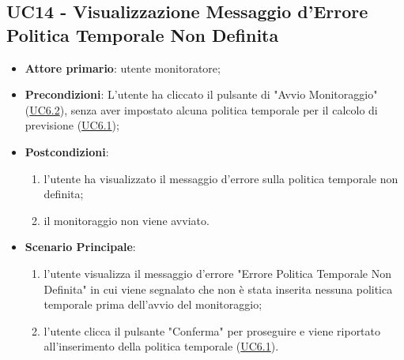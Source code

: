 
		\label{par:UC14}
	\subsection{UC14 - Visualizzazione Messaggio d'Errore Politica Temporale Non Definita}
		\begin{itemize}
			\item\textbf{Attore primario}: utente monitoratore;
			\item\textbf{Precondizioni}: L’utente ha cliccato il pulsante di "Avvio Monitoraggio" (\hyperref[par:UC6.2]{UC6.2}), senza aver impostato alcuna politica temporale per il calcolo di previsione  (\hyperref[par:UC6.1]{UC6.1});
			\item\textbf{Postcondizioni}:
				\begin{enumerate} 
					\item l’utente ha visualizzato il messaggio d'errore sulla politica temporale non definita;		
					\item	il monitoraggio non viene avviato.
				\end{enumerate}
			\item\textbf{Scenario Principale}: 
				\begin{enumerate} 
					\item l’utente visualizza il messaggio d'errore "Errore Politica Temporale Non Definita" in cui viene segnalato che non è stata inserita nessuna politica temporale prima dell'avvio del monitoraggio; 
					\item l'utente clicca il pulsante "Conferma" per proseguire e viene riportato all'inserimento della politica temporale (\hyperref[par:UC6.1]{UC6.1}).		
				\end{enumerate}		
		\end{itemize}

	
		\label{par:UC15}
